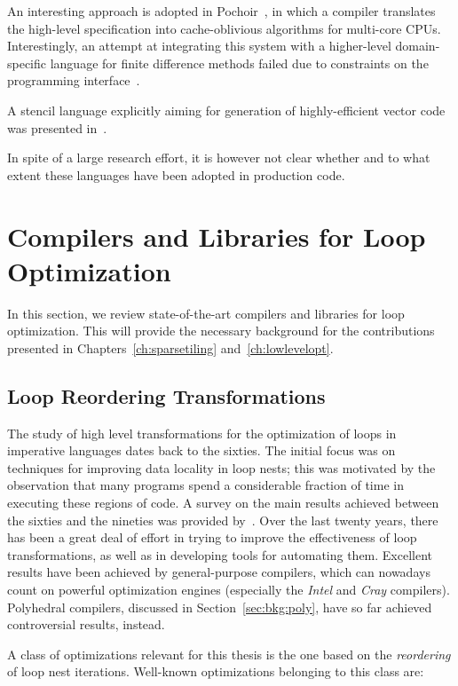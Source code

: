 An interesting approach is adopted in Pochoir~\citep{pochoir}, in which a compiler translates the high-level specification into cache-oblivious algorithms for multi-core CPUs. Interestingly, an attempt at integrating this system with a higher-level domain-specific language for finite difference methods failed due to constraints on the programming interface~\citep{TJ-OPESCI}. 

A stencil language explicitly aiming for generation of highly-efficient vector code was presented in~\cite{stencil-compiler}.

In spite of a large research effort, it is however not clear whether and to what extent these languages have been adopted in production code. 


\section{Compilers and Libraries for Loop Optimization}
\label{sec:bkg:codeopt}
In this section, we review state-of-the-art compilers and libraries for loop optimization. This will provide the necessary background for the contributions presented in Chapters~\ref{ch:sparsetiling} and~\ref{ch:lowlevelopt}.

\subsection{Loop Reordering Transformations}
\label{sec:bkg:loop-transf}
The study of high level transformations for the optimization of loops in imperative languages dates back to the sixties. The initial focus was on techniques for improving data locality in loop nests; this was motivated by the observation that many programs spend a considerable fraction of time in executing these regions of code. A survey on the main results achieved between the sixties and the nineties was provided by~\cite{bacon-comp-transf}. Over the last twenty years, there has been a great deal of effort in trying to improve the effectiveness of loop transformations, as well as in developing tools for automating them. Excellent results have been achieved by general-purpose compilers, which can nowadays count on powerful optimization engines (especially the {\em Intel} and {\em Cray} compilers). Polyhedral compilers, discussed in Section~\ref{sec:bkg:poly}, have so far achieved controversial results, instead.

A class of optimizations relevant for this thesis is the one based on the {\em reordering} of loop nest iterations. Well-known optimizations belonging to this class are:

